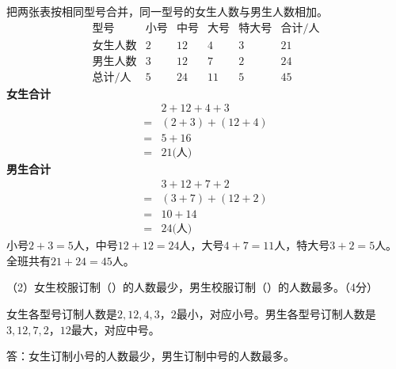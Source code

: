 \begin{BookAnswer}
把两张表按相同型号合并，同一型号的女生人数与男生人数相加。
\[\begin{array}{c|rrrr|r}
\text{型号}&\text{小号}&\text{中号}&\text{大号}&\text{特大号}&\text{合计/人}\\\hline
\text{女生人数}&2&12&4&3&21\\
\text{男生人数}&3&12&7&2&24\\
\text{总计/人}&5&24&11&5&45
\end{array}\]
\textbf{女生合计}
\[\begin{aligned}&2+12+4+3\\={}&(2+3)+(12+4)\\={}&5+16\\={}&21\text{(人)}\end{aligned}\]
\textbf{男生合计}
\[\begin{aligned}&3+12+7+2\\={}&(3+7)+(12+2)\\={}&10+14\\={}&24\text{(人)}\end{aligned}\]
小号\(2+3=5\)人，中号\(12+12=24\)人，大号\(4+7=11\)人，特大号\(3+2=5\)人。全班共有\(21+24=45\)人。
\end{BookAnswer}

（2）女生校服订制（\hspace{1.8em}）的人数最少，男生校服订制（\hspace{1.8em}）的人数最多。（4分）\par
\begin{BookAnswer}
女生各型号订制人数是\(2,12,4,3\)，\allowbreak{}\(2\)最小，对应小号。男生各型号订制人数是\(3,12,7,2\)，\allowbreak{}\(12\)最大，对应中号。\par
答：女生订制小号的人数最少，男生订制中号的人数最多。
\end{BookAnswer}
